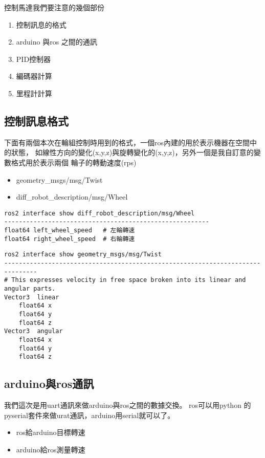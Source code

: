 控制馬達我們要注意的幾個部份
\begin{enumerate}
    \item 控制訊息的格式
    \item arduino 與ros 之間的通訊
    \item PID控制器
    \item 編碼器計算
    \item 里程計計算
\end{enumerate}

\subsection{控制訊息格式}
下面有兩個本次在輪組控制時用到的格式，一個ros內建的用於表示機器在空間中的狀態，
如線性方向的變化(x,y,z)與旋轉變化的(x,y,z)，另外一個是我自訂意的變數格式用於表示兩個
輪子的轉動速度(rps)
\begin{itemize}
    \item geometry\_msgs/msg/Twist
    \item diff\_robot\_description/msg/Wheel
\end{itemize}
\begin{tcolorbox}
\begin{verbatim}
ros2 interface show diff_robot_description/msg/Wheel        
--------------------------------------------------------
float64 left_wheel_speed   # 左輪轉速
float64 right_wheel_speed  # 右輪轉速
\end{verbatim}
\end{tcolorbox}
\begin{tcolorbox}
\begin{verbatim}
ros2 interface show geometry_msgs/msg/Twist
-------------------------------------------------------------------------------
# This expresses velocity in free space broken into its linear and angular parts.
Vector3  linear
	float64 x
	float64 y
	float64 z
Vector3  angular
	float64 x
	float64 y
	float64 z
\end{verbatim}
\end{tcolorbox}


\subsection{arduino與ros通訊}
我們這次是用uart通訊來做arduino與ros之間的數據交換。
ros可以用python 的pyserial套件來做urat通訊，arduino用serial就可以了。
\begin{itemize}
    \item ros給arduino目標轉速
    \item arduino給ros測量轉速
\end{itemize}

